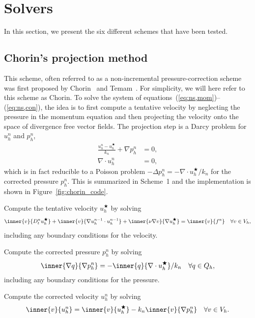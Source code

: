 \section{Solvers}
\label{methods}

In this section, we present the six different schemes that have been
tested.

\subsection{Chorin's projection method}
\label{sec:chorin}

This scheme, often referred to as a non-incremental
pressure-correction scheme was first proposed by Chorin~\cite{chorin}
and Temam~\cite{temam}. For simplicity, we will here refer to this
scheme as Chorin. To solve the system of
equations~(\ref{eq:ns,mom})--(\ref{eq:ns,con}), the idea is to first
compute a tentative velocity by neglecting the pressure in the
momentum equation and then projecting the velocity onto the space of
divergence free vector fields. The projection step is a Darcy problem
for $u_h^n$ and $p^n_h$,
\begin{align*}
  \frac{u_h^n -u_h^{\bigstar}}{k_n} + \nabla p^n_h &= 0, \\
 \nabla \cdot u_h^n &= 0,
\end{align*}
which is in fact reducible to a Poisson problem $-\Delta p^n_h =
- \nabla \cdot u_h^{\bigstar} / k_n$ for the corrected pressure
$p^n_h$. This is summarized in Scheme~1 and the implementation is
shown in Figure~\ref{fig:chorin_code}.

{
\item
  Compute the tentative velocity $u_h^\bigstar$ by solving
  \begin{equation}\label{eq:chorin,1}
    \inner{v}{D_t^n u_h^\bigstar}
    + \inner{v}{\nabla u_h^{n-1} \cdot u_h^{n-1}}
    + \inner{\nu \nabla v}{\nabla u_h^{\bigstar}}
    = \inner{v}{f^n} \quad \forall v \in V_h,
  \end{equation}
  including any boundary conditions for the velocity.

\item
  Compute the corrected pressure $p_h^n$ by solving
  \begin{equation}\label{eq:chorin,2}
    \inner{\nabla q}{\nabla p_h^n}
    = -\inner{q}{\nabla \cdot u_h^{\bigstar}} / k_n \quad \forall q \in Q_h,
  \end{equation}
  including any boundary conditions for the pressure.

\item
  Compute the corrected velocity $u_h^n$ by solving
  \begin{equation}\label{eq:chorin,3}
    \inner{v}{u_h^n} = \inner{v}{u_h^{\bigstar}} - k_n \inner{v}{\nabla p_h^n}
    \quad \forall v \in V_h.
  \end{equation}
}

